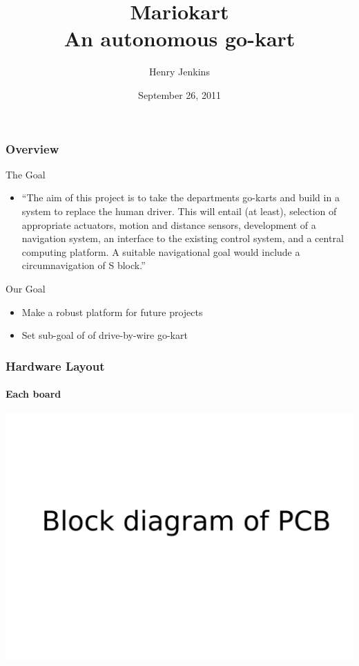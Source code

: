 \documentclass{beamer}
\begin{document}
\ECFAugie

\begin{frame}
\title{Mariokart \\ An autonomous go-kart}
\author{Henry Jenkins}
\date{September 26, 2011}
\maketitle
\end{frame}

\begin{frame}
\frametitle{Overview}
The Goal
\begin{itemize}
\item ``The aim of this project is to take the departments go-karts and build in a
system to replace the human driver. This will entail (at least), selection of
appropriate actuators, motion and distance sensors, development of a navigation
system, an interface to the existing control system, and a central computing
platform. A suitable navigational goal would include a circumnavigation of S
block.''
\end{itemize}

Our Goal
\begin{itemize}
\item Make a robust platform for future projects
\item Set sub-goal of of drive-by-wire go-kart
\end{itemize}
\end{frame}

\begin{frame}
\frametitle{Hardware Layout}
\framesubtitle{Each board}
    \begin{center}
      \includegraphics[width=.95\textwidth]{Images/Hardware_block}
    \end{center}
\end{frame}
\end{document}
